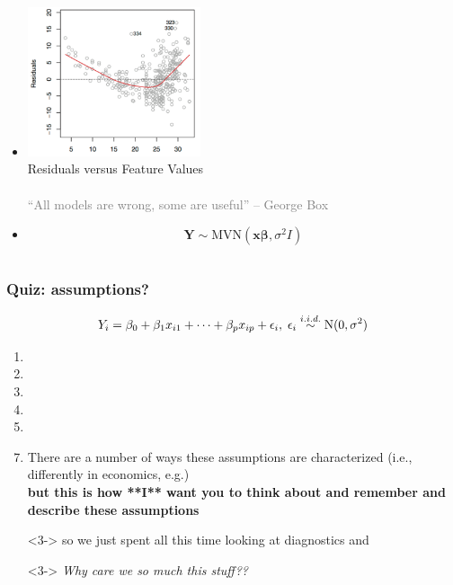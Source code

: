 \documentclass[xcolor={dvipsnames}]{beamer}
\begin{document}
{\begin{columns}
\begin{column}{.67\textwidth}
\begin{itemize}
\item<7>[] 
\vspace{-1.25in}
\includegraphics[width=2in]{stuff/resids.png}\\ %
Residuals versus Feature Values\\${}$\\
\textcolor{gray}{``All models are wrong, some are useful'' -- George Box}

\item<8>[]\huge 
\vspace{-2.5in}$${\boldsymbol Y} \sim  \textrm{MVN}(\textbf{x}{\boldsymbol\beta},\sigma^2I)$$

\end{itemize}
\end{column}
\end{columns}



}




\frame
{
 \frametitle{Quiz: assumptions?}

$$Y_i = \beta_0+\beta_1x_{i1} + \cdots + \beta_px_{ip} + \epsilon_i,  \;  \epsilon_i \overset{\tiny i.i.d.}{\sim} \textrm{N}(0,\sigma^2)$$


\begin{enumerate}
\item
\item
\item
\item
\item
\item[]
\item<2->[] \tiny There are a number of ways these assumptions are characterized (i.e., differently in economics, e.g.) \\
\textbf{but this is how **I** want you to think about and remember and describe these assumptions}
\end{enumerate}

\large
\begin{itemize}
\footnotesize
\setlength\itemsep{.15em}
\color{red}
\item[]<3-> so we just spent all this time looking at diagnostics and \item[]
\item[]<3-> \huge \emph{Why care we so much this stuff??}
\end{itemize}

}
\end{document}
